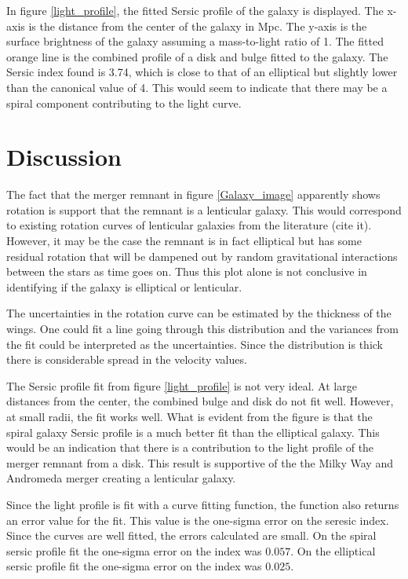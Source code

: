 \documentclass[fleqn,usenatbib]{mnras}
\begin{document}
In figure \ref{light_profile}, the fitted Sersic profile of the galaxy is displayed. The x-axis is the distance from the center of the galaxy in Mpc. The y-axis is the surface brightness of the galaxy assuming a mass-to-light ratio of 1. The fitted orange line is the combined profile of a disk and bulge fitted to the galaxy. The Sersic index found is 3.74, which is close to that of an elliptical but slightly lower than the canonical value of 4. This would seem to indicate that there may be a spiral component contributing to the light curve.

 \section{Discussion}
 The fact that the merger remnant in figure \ref{Galaxy_image} apparently shows rotation is support that the remnant is a lenticular galaxy. This would correspond to existing rotation curves of lenticular galaxies from the literature (cite it). However, it may be the case the remnant is in fact elliptical but has some residual rotation that will be dampened out by random gravitational interactions between the stars as time goes on. Thus this plot alone is not conclusive in identifying if the galaxy is elliptical or lenticular.

 The uncertainties in the rotation curve can be estimated by the thickness of the wings. One could fit a line going through this distribution and the variances from the fit could be interpreted as the uncertainties. Since the distribution is thick there is considerable spread in the velocity values.

The Sersic profile fit from figure \ref{light_profile} is not very ideal. At large distances from the center, the combined bulge and disk do not fit well. However, at small radii, the fit works well. What is evident from the figure is that the spiral galaxy Sersic profile is a much better fit than the elliptical galaxy. This would be an indication that there is a contribution to the light profile of the merger remnant from a disk. This result is supportive of the the Milky Way and Andromeda merger creating a lenticular galaxy.

Since the light profile is fit with a curve fitting function, the function also returns an error value for the fit. This value is the one-sigma error on the seresic index. Since the curves are well fitted, the errors calculated are small. On the spiral sersic profile fit the one-sigma error on the index was $0.057$. On the elliptical sersic profile fit the one-sigma error on the index was $0.025$.
\end{document}
